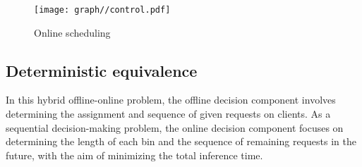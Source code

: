 




\begin{figure}
    \centering
    \texttt{[image: graph//control.pdf]}
    \caption{Online scheduling}
    \label{fig:control}
\end{figure}

\subsection{Deterministic equivalence}
In this hybrid offline-online problem, the offline decision component involves determining the assignment and sequence of given requests on clients.
As a sequential decision-making problem, the online decision component focuses on determining the length of each bin and the sequence of remaining requests in the future, with the aim of minimizing the total inference time. 


